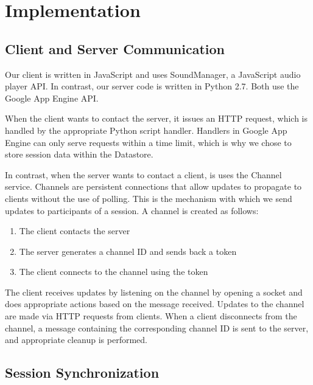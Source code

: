 \section{Implementation}
\label{sec:implementation}

\subsection{Client and Server Communication}
Our client is written in JavaScript and uses SoundManager, a
JavaScript audio player API. In contrast, our server code is
written in Python 2.7. Both use the Google App Engine API. 

When the client wants to contact the server, it issues an HTTP
request, which is handled by the appropriate Python script handler.
Handlers in Google App Engine can only serve requests within a
time limit, which is why we chose to store session data within
the Datastore.

In contrast, when the server wants to contact a client, is uses 
the Channel service. Channels are persistent connections that 
allow updates to propagate to clients without the use of polling.
This is the mechanism with which we send updates to participants
of a session. A channel is created as follows: 
\begin{enumerate}
  \item The client contacts the server
  \item The server generates a channel ID and sends back a token
  \item The client connects to the channel using the token
\end{enumerate}
The client receives updates by listening on the channel by opening
a socket and does appropriate actions based on the message received.
Updates to the channel are made via HTTP requests from clients. When
a client disconnects from the channel, a message containing the 
corresponding channel ID is sent to the server, and appropriate
cleanup is performed.	

\subsection{Session Synchronization}
\label{sec:sync}

